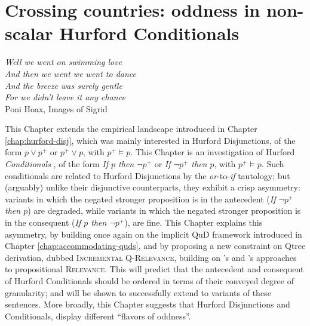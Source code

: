 \chapter[Crossing countries: oddness in non-scalar Hurford Conditionals]{Crossing countries: oddness in non-scalar Hurford Conditionals\footnotemark}\label{chap:hurford-sentences}

\begin{flushright}
	\textit{Well we went on swimming love}\\
	\textit{And then we went we went to dance}\\
	\textit{And the breeze was surely gentle}\\
	\textit{For we didn't leave it any chance}\\\vspace{2mm}
	Poni Hoax, Images of Sigrid
\end{flushright}


This Chapter extends the empirical landscape introduced in Chapter \ref{chap:hurford-disj}, which was mainly interested in Hurford Disjunctions, of the form $p \vee p^+$ or $p^+ \vee p$, with $p^+ \vDash p$. This Chapter is an investigation of Hurford \textit{Conditionals} \parencite{Mandelkern2018,Kalomoiros2024}, of the form \textit{If $p$ then $\neg p^+$} or \textit{If $\neg p^+$ then $p$}, with $p^+ \vDash p$. Such conditionals are related to Hurford Disjunctions by the \textit{or}-to-\textit{if} tautology; but (arguably) unlike their disjunctive counterparts, they exhibit a crisp asymmetry: variants in which the negated stronger proposition is in the antecedent (\textit{If $\neg p^+$ then $p$}) are degraded, while variants in which the negated stronger proposition is in the consequent (\textit{If $p$ then $\neg p^+$}), are fine. This Chapter explains this asymmetry, by building once again on the implicit QuD framework introduced in Chapter \ref{chap:accommodating-quds}, and by proposing a new constraint on Qtree derivation, dubbed \textsc{Incremental Q-Relevance}, building on \citeauthor*{Lewis1988}'s and \citeauthor{Roberts2012}'s approaches to propositional \textsc{Relevance}. This will predict that the antecedent and consequent of Hurford Conditionals should be ordered in terms of their conveyed degree of granularity; and will be shown to successfully extend to variants of these sentences. More broadly, this Chapter suggests that Hurford Disjunctions and Conditionals, display different ``flavors of oddness''.





